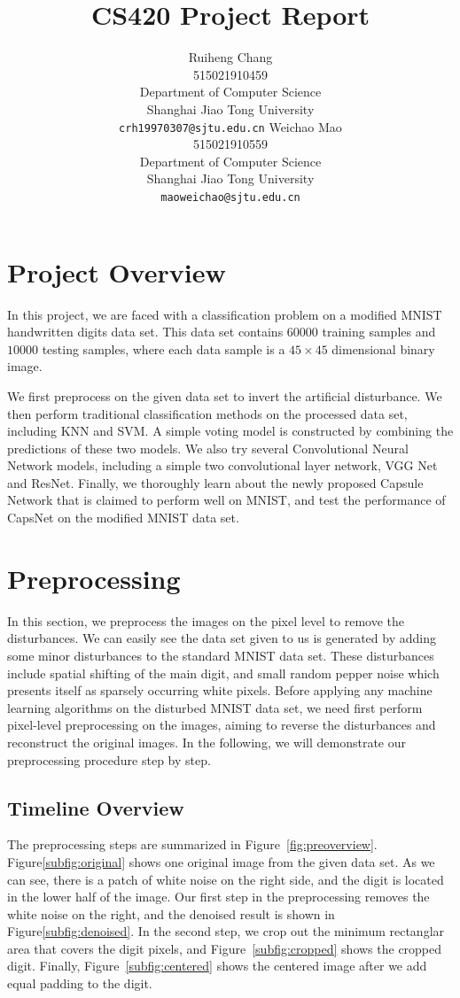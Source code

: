 \documentclass{article}
\title{CS420 Project Report}
\author{
  Ruiheng Chang \\
  515021910459\\
  Department of Computer Science\\
  Shanghai Jiao Tong University\\
  \texttt{crh19970307@sjtu.edu.cn}
  \And
  Weichao Mao \\
  515021910559\\
  Department of Computer Science\\
  Shanghai Jiao Tong University\\
  \texttt{maoweichao@sjtu.edu.cn}
}
\begin{document}

\maketitle

\section{Project Overview}

In this project, we are faced with a classification problem on a modified MNIST handwritten digits data set. This data set contains $60000$ training samples and $10000$ testing samples, where each data sample is a $45 \times 45$ dimensional binary image. 

We first preprocess on the given data set to invert the artificial disturbance. We then perform traditional classification methods on the processed data set, including KNN and SVM. A simple voting model is constructed by combining the predictions of these two models. We also try several Convolutional Neural Network models, including a simple two convolutional layer network, VGG Net and ResNet. Finally, we thoroughly learn about the newly proposed Capsule Network that is claimed to perform well on MNIST, and test the performance of CapsNet on the modified MNIST data set.

\section{Preprocessing}
In this section, we preprocess the images on the pixel level to remove the disturbances. We can easily see the data set given to us is generated by adding some minor disturbances to the standard MNIST data set. These disturbances include spatial shifting of the main digit, and small random pepper noise which presents itself as sparsely occurring white pixels. Before applying any machine learning algorithms on the disturbed MNIST data set, we need first perform pixel-level preprocessing on the images, aiming to reverse the disturbances and reconstruct the original images. In the following, we will demonstrate our preprocessing procedure step by step.

\subsection{Timeline Overview}
The preprocessing steps are summarized in Figure~\ref{fig:preoverview}. Figure\ref{subfig:original} shows one original image from the given data set. As we can see, there is a patch of white noise on the right side, and the digit is located in the lower half of the image. Our first step in the preprocessing removes the white noise on the right, and the denoised result is shown in Figure\ref{subfig:denoised}. In the second step, we crop out the minimum rectanglar area that covers the digit pixels, and Figure~\ref{subfig:cropped} shows the cropped digit. Finally, Figure~\ref{subfig:centered} shows the centered image after we add equal padding to the digit. 
\end{document}
